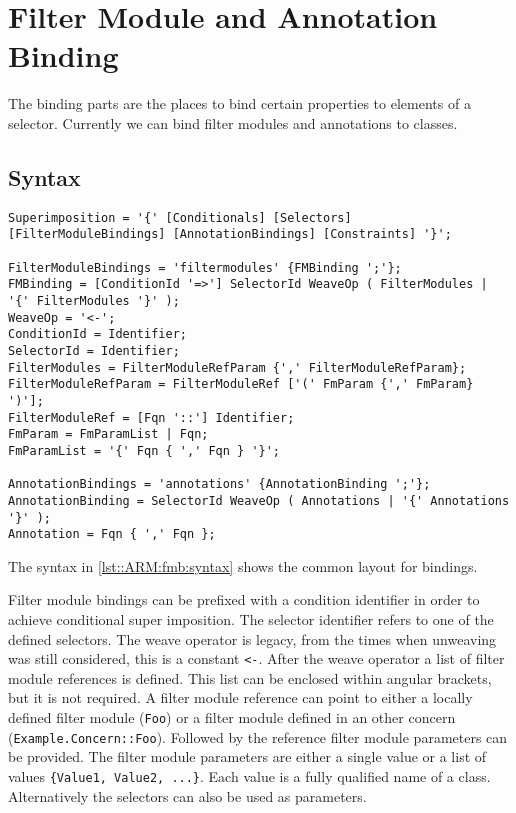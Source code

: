 \chapter{Filter Module and Annotation Binding} \label{ch::arm::fmb}
The binding parts are the places to bind certain properties to elements of a selector. 
Currently we can bind filter modules and annotations to classes.

\section{Syntax}
\begin{lstlisting}[caption = {Bindings syntax}, label = lst::ARM:fmb:syntax, style = listing, language = ebnf, float = tpb]
Superimposition = '{' [Conditionals] [Selectors] [FilterModuleBindings] [AnnotationBindings] [Constraints] '}';

FilterModuleBindings = 'filtermodules' {FMBinding ';'};
FMBinding = [ConditionId '=>'] SelectorId WeaveOp ( FilterModules | '{' FilterModules '}' );
WeaveOp = '<-';
ConditionId = Identifier;
SelectorId = Identifier;
FilterModules = FilterModuleRefParam {',' FilterModuleRefParam};
FilterModuleRefParam = FilterModuleRef ['(' FmParam {',' FmParam} ')'];
FilterModuleRef = [Fqn '::'] Identifier;
FmParam = FmParamList | Fqn;
FmParamList = '{' Fqn { ',' Fqn } '}';

AnnotationBindings = 'annotations' {AnnotationBinding ';'};
AnnotationBinding = SelectorId WeaveOp ( Annotations | '{' Annotations '}' );
Annotation = Fqn { ',' Fqn };
\end{lstlisting}
The syntax in \autoref{lst::ARM:fmb:syntax} shows the common layout for bindings. 

Filter module bindings can be prefixed with a condition identifier in order to achieve conditional super imposition.
The selector identifier refers to one of the defined selectors.
The weave operator is legacy, from the times when unweaving was still considered, this is a constant \lstinline|<-|.
After the weave operator a list of filter module references is defined.
This list can be enclosed within angular brackets, but it is not required.
A filter module reference can point to either a locally defined filter module (\lstinline|Foo|) or a filter module defined in an other concern (\lstinline|Example.Concern::Foo|).
Followed by the reference filter module parameters can be provided.
The filter module parameters are either a single value or a list of values \lstinline|{Value1, Value2, ...}|.
Each value is a fully qualified name of a class.
Alternatively the selectors can also be used as parameters.

